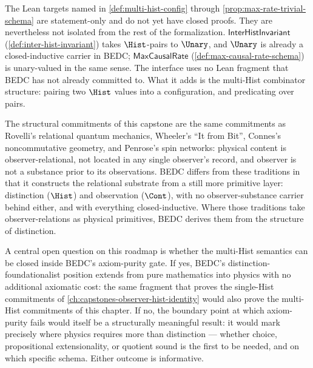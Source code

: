 \begin{remark}
\label{rem:relation-existing-lean}
The Lean targets named in \autoref{def:multi-hist-config} through \autoref{prop:max-rate-trivial-schema} are statement-only and do not yet have closed proofs. They are nevertheless not isolated from the rest of the formalization. \(\mathsf{InterHistInvariant}\) (\autoref{def:inter-hist-invariant}) takes \(\Hist\)-pairs to \(\Unary\), and \(\Unary\) is already a closed-inductive carrier in BEDC; \(\mathsf{MaxCausalRate}\) (\autoref{def:max-causal-rate-schema}) is unary-valued in the same sense. The interface uses no Lean fragment that BEDC has not already committed to. What it adds is the multi-Hist combinator structure: pairing two \(\Hist\) values into a configuration, and predicating over pairs.
\end{remark}

\begin{remark}
\label{rem:relational-physics}
The structural commitments of this capstone are the same commitments as Rovelli's relational quantum mechanics, Wheeler's ``It from Bit'', Connes's noncommutative geometry, and Penrose's spin networks: physical content is observer-relational, not located in any single observer's record, and observer is not a substance prior to its observations. BEDC differs from these traditions in that it constructs the relational substrate from a still more primitive layer: distinction (\(\Hist\)) and observation (\(\Cont\)), with no observer-substance carrier behind either, and with everything closed-inductive. Where those traditions take observer-relations as physical primitives, BEDC derives them from the structure of distinction.
\end{remark}

\begin{remark}
\label{rem:schema-only-axiom-purity}
A central open question on this roadmap is whether the multi-Hist semantics can be closed inside BEDC's axiom-purity gate. If yes, BEDC's distinction-foundationalist position extends from pure mathematics into physics with no additional axiomatic cost: the same fragment that proves the single-Hist commitments of \autoref{ch:capstones-observer-hist-identity} would also prove the multi-Hist commitments of this chapter. If no, the boundary point at which axiom-purity fails would itself be a structurally meaningful result: it would mark precisely where physics requires more than distinction --- whether choice, propositional extensionality, or quotient sound is the first to be needed, and on which specific schema. Either outcome is informative.
\end{remark}

